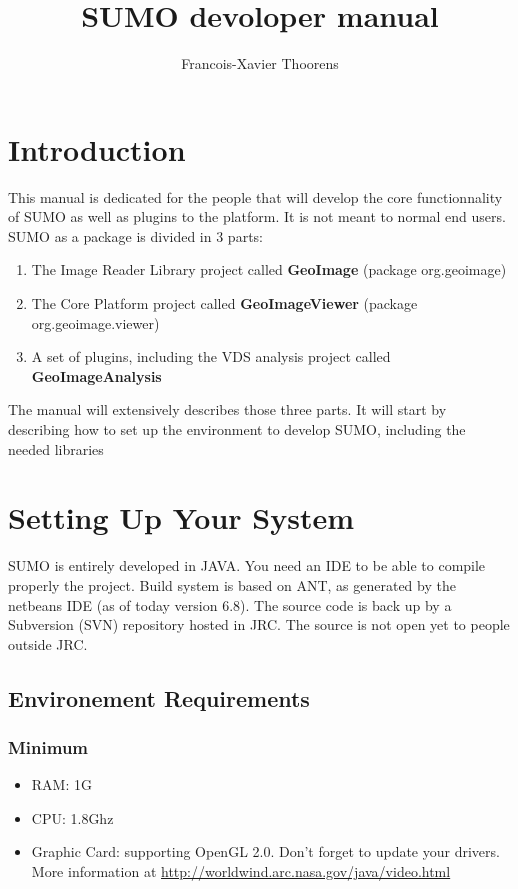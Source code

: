 \documentclass[12pt,a4paper,final,makeidx]{report}
\author{Francois-Xavier Thoorens}
\title{SUMO devoloper manual}
\begin{document}
\maketitle
\tableofcontents



\chapter{Introduction}

This manual is dedicated for the people that will develop the core functionnality of SUMO as well as plugins to the platform.
It is not meant to normal end users.
SUMO as a package is divided in 3 parts:
\begin{enumerate}
\item The Image Reader Library project called \textbf{GeoImage} (package org.geoimage)
\item The Core Platform project called \textbf{GeoImageViewer} (package org.geoimage.viewer)
\item A set of plugins, including the VDS analysis project called \textbf{GeoImageAnalysis}
\end{enumerate}
The manual will extensively describes those three parts.
It will start by describing how to set up the environment to develop SUMO, including the needed libraries



\chapter{Setting Up Your System}

SUMO is entirely developed in JAVA. You need an IDE to be able to compile properly the project.
Build system is based on ANT, as generated by the netbeans IDE (as of today version 6.8). The source code is back up by a Subversion (SVN) repository hosted in JRC. The source is not open yet to people outside JRC.

\section{Environement Requirements}
\subsection{Minimum}
\begin{itemize}
\item RAM: 1G
\item CPU: 1.8Ghz
\item Graphic Card: supporting OpenGL 2.0. Don't forget to update your drivers. More information at \url{http://worldwind.arc.nasa.gov/java/video.html}
\end{itemize}
\end{document}
